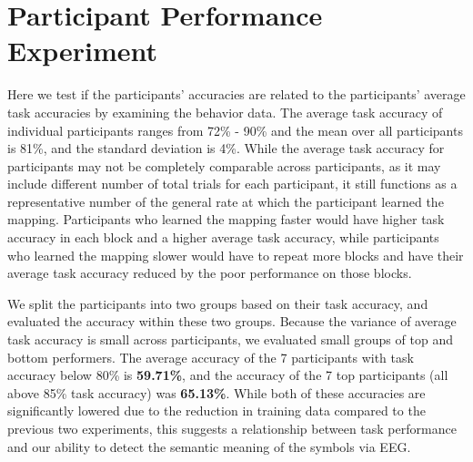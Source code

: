 \section{Participant Performance Experiment}

Here we test if the participants' \tvt accuracies are related to the 
participants' average task accuracies by examining the behavior data. The 
average task accuracy of individual participants ranges from 72\% - 90\% and 
the mean over all participants is 81\%, and the standard deviation is 4\%.  
While the average task accuracy for participants may not be completely 
comparable across participants, as it may include different number of total 
trials for each participant, it still functions as a representative number of 
the general rate at which the participant learned the mapping. Participants who 
learned the mapping faster would have higher task accuracy in each block and a 
higher average task accuracy, while participants who learned the mapping slower 
would have to repeat more blocks and have their average task accuracy reduced 
by the poor performance on those blocks.

We split the participants into two groups based on their task accuracy, and 
evaluated the \tvt accuracy within these two groups. Because the variance of 
average task accuracy is small across participants, we evaluated small groups 
of top and bottom performers. The average \tvt accuracy of the 7 participants 
with task accuracy below 80\% is {\bf 59.71\%}, and the \tvt accuracy of the 7 
top participants (all above 85\% task accuracy) was {\bf 65.13\%}. While both 
of these \tvt accuracies are significantly lowered due to the reduction in 
training data compared to the previous two experiments, this suggests a 
relationship between task performance and our ability to detect the semantic 
meaning of the symbols via EEG.
